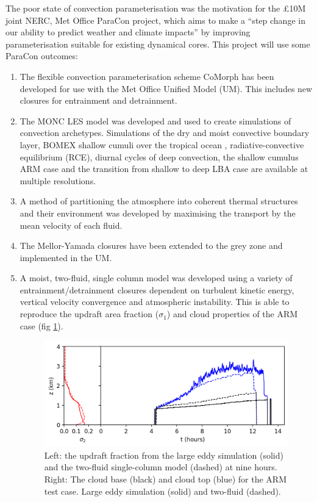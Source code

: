 \documentclass[11pt,a4paper]{article}
\begin{document}
The poor state of convection parameterisation was the motivation for the \pounds 10M joint NERC, Met Office ParaCon project, which aims to make a ``step change in our ability to predict weather and climate impacts'' by improving parameterisation suitable for existing dynamical cores. This project will use some ParaCon outcomes:
\begin{enumerate}
\item The flexible convection parameterisation scheme CoMorph has been developed for use with the Met Office Unified Model (UM). This includes new closures for entrainment and detrainment.

\item The MONC LES model was developed and used to create simulations of convection archetypes. Simulations of the dry and moist convective boundary layer, BOMEX shallow cumuli over the tropical ocean \cite[]{HR73}, radiative-convective equilibrium (RCE), diurnal cycles of deep convection, the shallow cumulus ARM case \cite[]{BCC+02} and the transition from shallow to deep LBA case \cite[]{BFGB02} are available at multiple resolutions.

\item A method of partitioning the atmosphere into coherent thermal structures and their environment was developed \cite[]{ETB20} by maximising the transport by the mean velocity of each fluid.

\item The Mellor-Yamada closures have been extended to the grey zone and implemented in the UM.

\item A moist, two-fluid, single column model was developed using a variety of entrainment/detrainment closures dependent on turbulent kinetic energy, vertical velocity convergence and atmospheric instability. This is able to reproduce the updraft area fraction ($\sigma_1$) and cloud properties of the ARM case \cite[]{BCC+02} (fig \ref{fig:clouds}). 

\begin{figure}
\includegraphics[width=\linewidth]{exeterScm.png}
\caption{Left: the updraft fraction from the large eddy simulation (solid) and the two-fluid single-column model (dashed) at nine hours. Right: The cloud base (black) and cloud top (blue) for the ARM test case. Large eddy simulation (solid) and two-fluid (dashed).}
\label{fig:clouds}
\end{figure}


\end{enumerate}
\end{document}
